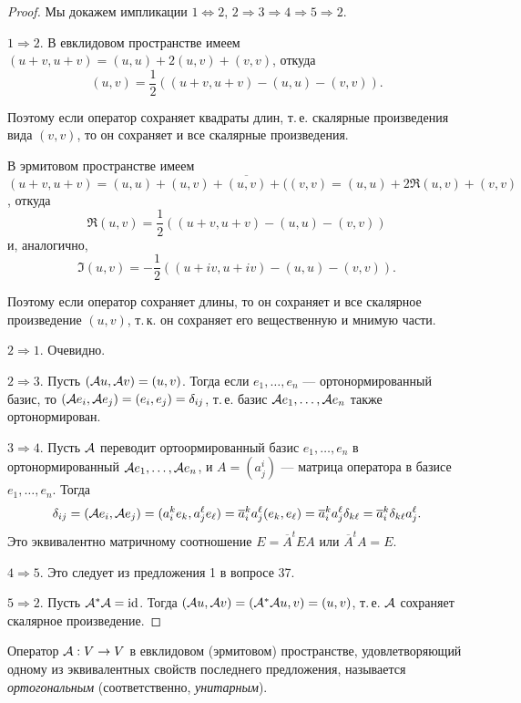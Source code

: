 \begin{proof}
    Мы докажем импликации $1 \Leftrightarrow 2$, $2 \Rightarrow 3 \Rightarrow 4 \Rightarrow 5 \Rightarrow 2$.

    $1 \Rightarrow 2$. В евклидовом пространстве имеем $(u + v, u + v) = (u, u) + 2(u, v) + (v, v)$, откуда
    \[
        (u, v) = \frac{1}{2}((u + v, u + v) - (u, u) - (v, v)).
    \]

    Поэтому если оператор сохраняет квадраты длин, т.\,е. скалярные произведения вида $(v, v)$, то он сохраняет и все скалярные произведения.

    В эрмитовом пространстве имеем $(u + v, u + v) = (u, u) + (u, v) + \overline{(u, v)} + ((v, v) = (u, u) + 2\Re(u, v) + (v, v)$, откуда
    \[
        \Re(u, v) = \frac{1}{2}((u + v, u + v) - (u, u) - (v, v))
    \]
    и, аналогично,
    \[
        \Im(u, v) = -\frac{1}{2}((u + iv, u + iv) - (u, u) - (v, v)).
    \]

    Поэтому если оператор сохраняет длины, то он сохраняет и все скалярное произведение $(u, v)$, т.\,к. он сохраняет его вещественную и мнимую части.

    $2 \Rightarrow 1$. Очевидно.

    $2 \Rightarrow 3$. Пусть $(\mathcal{A} u, \mathcal{A} v) = (u, v)$. Тогда если $e_1, \ldots, e_n$ --- ортонормированный базис, то $(\mathcal{A} e_i, \mathcal{A} e_j) = (e_i, e_j) = \delta_{ij}$, т.\,е. базис $\mathcal{A} e_1, \ldots, \mathcal{A} e_n$ также ортонормирован.
    
    $3 \Rightarrow 4$. Пусть $\mathcal{A}$ переводит ортоормированный базис $e_1, \ldots, e_n$ в ортонормированный $\mathcal{A} e_1, \ldots, \mathcal{A} e_n$, и $A = (a^i_j)$ --- матрица оператора в базисе $e_1, \ldots, e_n$. Тогда
    \[
        \delta_{ij} = (\mathcal{A} e_i, \mathcal{A} e_j) = (a^k_ie_k, a^\ell_je_\ell) = \overline{a}^k_ia^\ell_j(e_k, e_\ell) = \overline{a}^k_ia^\ell_j\delta_{k\ell} = \overline{a}^k_i\delta_{k\ell}a^\ell_j.
    \]
    Это эквивалентно матричному соотношение $E = \overline{A}^tEA$ или $\overline{A}^tA = E$.

    $4 \Rightarrow 5$. Это следует из предложения 1 в вопросе 37.

    $5 \Rightarrow 2$. Пусть $\mathcal{A}^\ast\mathcal{A} = \mathrm{id}$. Тогда $(\mathcal{A} u, \mathcal{A} v) = (\mathcal{A}^\ast\mathcal{A} u, v) = (u, v)$, т.\,е. $\mathcal{A}$ сохраняет скалярное произведение.
\end{proof}

\begin{definition}
    Оператор $\mathcal{A}: V \to V$ в евклидовом (эрмитовом) пространстве, удовлетворяющий одному из эквивалентных свойств последнего предложения, называется \textit{ортогональным} (соответственно, \textit{унитарным}).
\end{definition}

